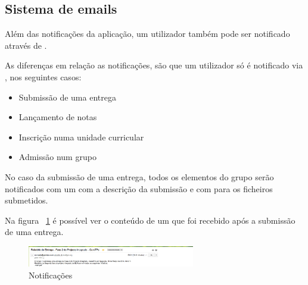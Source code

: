 \subsection{Sistema de emails}

Além das notificações da aplicação, um utilizador também pode ser notificado através de .

As diferenças em relação as notificações, são que um utilizador só é notificado via , nos seguintes casos:

\begin{itemize}
	\item Submissão de uma entrega
	\item Lançamento de notas
	\item Inscrição numa unidade curricular
	\item Admissão num grupo
\end{itemize}

No caso da submissão de uma entrega, todos os elementos do grupo serão notificados com um  com a descrição da submissão e com  para os ficheiros submetidos.

Na figura ~\ref{fig:mail} é possível ver o conteúdo de um  que foi recebido após a submissão de uma entrega.

\begin{figure}[H]
	\centering
	\includegraphics[width=0.65\textwidth,center]{images/implementacao/alunos/emails}
	\caption{Notificações}
	\label{fig:mail}
\end{figure}
